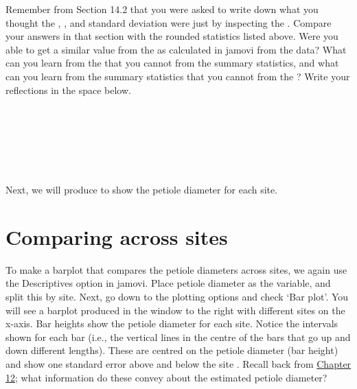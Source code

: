 \documentclass[
  openany]{krantz}
\begin{document}
Remember from Section 14.2 that you were asked to write down what you thought the , , and standard deviation were just by inspecting the .
Compare your answers in that section with the rounded statistics listed above.
Were you able to get a similar value from the  as calculated in jamovi from the data?
What can you learn from the  that you cannot from the summary statistics, and what can you learn from the summary statistics that you cannot from the ?
Write your reflections in the space below.

\begin{verbatim}






\end{verbatim}

Next, we will produce  to show the  petiole diameter for each site.

\hypertarget{comparing-across-sites}{%
\section{Comparing across sites}\label{comparing-across-sites}}

To make a barplot that compares the  petiole diameters across sites, we again use the Descriptives option in jamovi.
Place petiole diameter as the variable, and split this by site.
Next, go down to the plotting options and check `Bar plot'.
You will see a barplot produced in the window to the right with different sites on the x-axis.
Bar heights show the  petiole diameter for each site.
Notice the intervals shown for each bar (i.e., the vertical lines in the centre of the bars that go up and down different lengths).
These  are centred on the  petiole diameter (bar height) and show one standard error above and below the site .
Recall back from \protect\hyperlink{Chapter_12}{Chapter 12}; what information do these  convey about the estimated  petiole diameter?

\begin{verbatim}






\end{verbatim}
\end{document}

